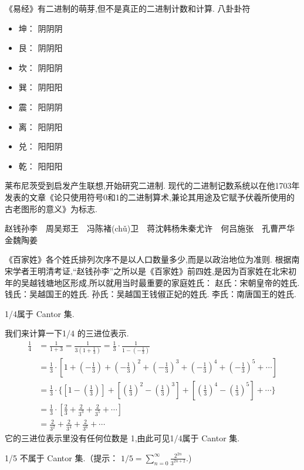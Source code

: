 《易经》有二进制的萌芽,但不是真正的二进制计数和计算.
八卦卦符
\begin{itemize}
\item 坤： 阴阴阴
\item 艮： 阴阴阳
\item 坎： 阴阳阴
\item 巽： 阴阳阳
\item 震： 阳阴阴
\item 离： 阳阴阳
\item 兑： 阳阳阴
\item 乾： 阳阳阳
\end{itemize}

莱布尼茨受到启发产生联想,开始研究二进制.
现代的二进制记数系统以在他1703年发表的文章《论只使用符号0和1的二进制算术,兼论其用途及它赋予伏羲所使用的古老图形的意义》为标志.



赵钱孙李　周吴郑王　冯陈褚(chǔ)卫　蒋沈韩杨朱秦尤许　何吕施张　孔曹严华　金魏陶姜

《百家姓》各个姓氏排列次序不是以人口数量多少,而是以政治地位为准则.
根据南宋学者王明清考证,“赵钱孙李”之所以是《百家姓》前四姓,是因为百家姓在北宋初年的吴越钱塘地区形成,所以就用当时最重要的家庭姓氏：
赵氏：宋朝皇帝的姓氏.
钱氏：吴越国王的姓氏.
孙氏：吴越国王钱俶正妃的姓氏.
李氏：南唐国王的姓氏.

\begin{example}
	1/4属于 Cantor 集.
\end{example}
我们来计算一下1/4 的三进位表示.
\begin{align*}
\frac{1}{4} &= \frac{1}{1+3} = \frac{1}{3(1+ \frac{1}{3})} 
  = \frac{1}{3} \cdot \frac{1}{1 - (- \frac{1}{3})} \\
  &	= \frac{1}{3} \cdot \left[ 
1 + \left(- \frac{1}{3}\right)
+  \left(- \frac{1}{3}\right)^2 + \left(- \frac{1}{3}\right)^3 
+ \left(- \frac{1}{3}\right)^4   +\left(- \frac{1}{3}\right)^5  +\cdots\right] \\
  &	= \frac{1}{3} \cdot\Big\{ \left[ 
1 - \left( \frac{1}{3}\right)\right]
+ \left[  \left(\frac{1}{3}\right)^2 - \left(\frac{1}{3}\right)^3 \right]
+ \left[ \left(\frac{1}{3}\right)^4   -\left(\frac{1}{3}\right)^5 \right] +\cdots\Big\}\\
  &	= \frac{1}{3} \cdot \left[ 
 \frac{2}{3}+ \frac{2}{3^3}+ \frac{2}{3^5}+\cdots\right] \\
&=  \frac{2}{3^2}+ \frac{2}{3^4}+ \frac{2}{3^6}+\cdots
\end{align*}
\noindent
它的三进位表示里没有任何位数是 1,由此可见1/4属于 Cantor 集.

\begin{Exercises}
	
	\item 1/5 不属于 Cantor 集.（提示：
	$1/5 = \sum_{n = 0}^\infty\frac{2^{2n}}{3^{2n+2}}$.)
	
	
\end{Exercises}


